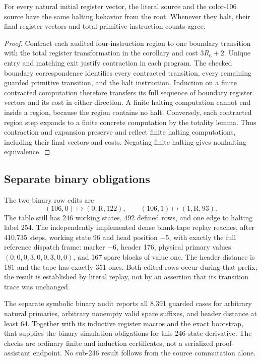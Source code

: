 \begin{theorem}
For every natural initial register vector, the literal source and the
color-106 source have the same halting behavior from the root.  Whenever
they halt, their final register vectors and total primitive-instruction
counts agree.
\end{theorem}
\begin{proof}
Contract each audited four-instruction region to one boundary transition
with the total register transformation in the corollary and cost
$3R_6+2$.  Unique entry and matching exit justify contraction in each
program.  The checked boundary correspondence identifies every
contracted transition, every remaining guarded primitive transition,
and the halt instruction.  Induction on a finite contracted computation
therefore transfers its full sequence of boundary register vectors and
its cost in either direction.  A finite halting computation cannot end
inside a region, because the region contains no halt.  Conversely, each
contracted region step expands to a finite concrete computation by the
totality lemma.  Thus contraction and expansion preserve and reflect
finite halting computations, including their final vectors and costs.
Negating finite halting gives nonhalting equivalence.
\end{proof}

\subsection{Separate binary obligations}

The two binary row edits are
\[
 (106,0)\mapsto(0,\mathrm R,122),\qquad
 (106,1)\mapsto(1,\mathrm R,93).
\]
The table still has 246 working states, 492 defined rows, and one edge
to halting label 254.  The independently implemented dense blank-tape
replay reaches, after 410,735 steps, working state 96 and head position
$-5$, with exactly the full reference dispatch frame: marker $-6$,
header 176, physical primary values $(0,0,0,3,0,0,3,0,0)$, and 167 spare
blocks of value one.  The header distance is 181 and the tape has
exactly 351 ones.  Both edited rows occur during that prefix; the result
is established by literal replay, not by an assertion that its transition
trace was unchanged.

The separate symbolic binary audit reports all 8,391 guarded cases for
arbitrary natural primaries, arbitrary nonempty valid spare suffixes,
and header distance at least 64.  Together with its inductive register
macros and the exact bootstrap, that supplies the binary simulation
obligations for this 246-state derivative.  The checks are ordinary
finite and induction certificates, not a serialized proof-assistant
endpoint.  No sub-246 result follows from the source commutation alone.

